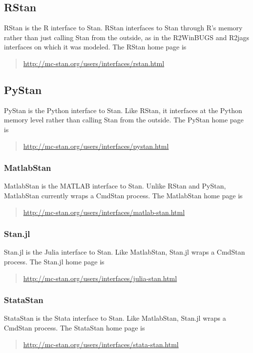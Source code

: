 \subsection{RStan}

RStan is the R interface to Stan.  RStan interfaces to Stan through
R's memory rather than just calling Stan from the outside, as in the
R2WinBUGS and R2jags interfaces on which it was modeled.  The RStan
home page is
%
\begin{quote}
\url{http://mc-stan.org/users/interfaces/rstan.html}
\end{quote}

\subsection{PyStan}

PyStan is the Python interface to Stan.  Like RStan, it interfaces at
the Python memory level rather than calling Stan from the outside.
The PyStan home page is
%
\begin{quote}
\url{http://mc-stan.org/users/interfaces/pystan.html}
\end{quote}

\subsubsection{MatlabStan}

MatlabStan is the MATLAB interface to Stan.  Unlike RStan and PyStan,
MatlabStan currently wraps a CmdStan process.  The
MatlabStan home page is
%
\begin{quote}
\url{http://mc-stan.org/users/interfaces/matlab-stan.html}
\end{quote}
%

\subsubsection{Stan.jl}

Stan.jl is the Julia interface to Stan.  Like MatlabStan, Stan.jl
wraps a CmdStan process.  The Stan.jl home page is
%
\begin{quote}
\url{http://mc-stan.org/users/interfaces/julia-stan.html}
\end{quote}
%

\subsubsection{StataStan}

StataStan is the Stata interface to Stan.  Like MatlabStan, Stan.jl
wraps a CmdStan process.  The StataStan home page is
%
\begin{quote}
\url{http://mc-stan.org/users/interfaces/stata-stan.html}
\end{quote}

